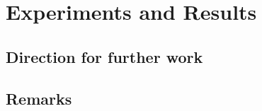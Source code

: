
\chapter{Experiments and Results}
\label{chapter6}

\ifpdf
\graphicspath{{Chapter6/Figs/Raster/}{Chapter6/Figs/PDF/}{Chapter6/Figs/}}
\else
\graphicspath{{Chapter6/Figs/Vector/}{Chapter6/Figs/}}
\fi


\section{Direction for further work}

\section{Remarks}








